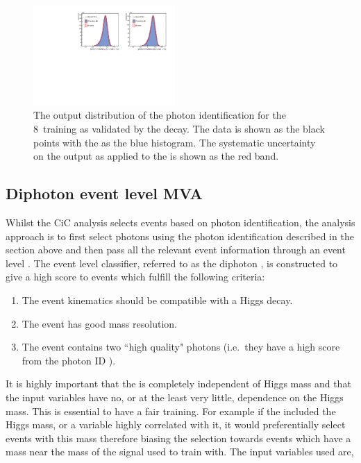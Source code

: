 \begin{figure}
  \includegraphics[width=0.48\textwidth]{selec_and_cats/plots/photonID_zee_8TeV.pdf}
  \caption{The output distribution of the photon identification \BDT for the 8~\TeV training as validated by the \Zee decay. The data is shown as the black points with the \MC as the blue histogram. The systematic uncertainty on the output as applied to the \MC is shown as the red band. }
  \label{fig:photon_id_zee}
\end{figure}

\subsection{Diphoton event level MVA}
\label{sec:diphoton_bdt}

Whilst the CiC analysis selects events based on photon identification, the \MVA analysis approach is to first select photons using the photon identification \BDT described in the section above and then pass all the relevant event information through an event level \BDT. The event level classifier, referred to as the diphoton \BDT, is constructed to give a high score to events which fulfill the following criteria:

\begin{enumerate}
  \item The event kinematics should be compatible with a Higgs decay.
  \item The event has good mass resolution.
  \item The event contains two ``high quality" photons (i.e.~they have a high score from the photon ID \BDT).
\end{enumerate}

It is highly important that the \BDT is completely independent of Higgs mass and that the input variables have no, or at the least very little, dependence on the Higgs mass. This is essential to have a fair training. For example if the \BDT included the Higgs mass, or a variable highly correlated with it, it would preferentially select events with this mass therefore biasing the selection towards events which have a mass near the mass of the signal used to train with. The input variables used are,


